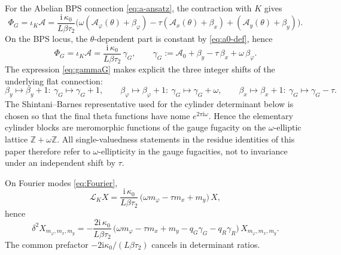 \documentclass[11pt,a4paper]{article}
\numberwithin{equation}{section}
\theoremstyle{plain}
\theoremstyle{definition}
\theoremstyle{remark}
\newcommand{\ii}{\mathrm{i}}
\begin{document}
For the Abelian BPS connection \eqref{eq:a-ansatz}, the contraction with $K$ gives
\[
\Phi_G=\iota_K\mathcal A=\frac{\ii\,\kappa_0}{L\beta\tau_2}\Big(\omega(\mathcal A_\varphi(\theta)+\beta_\varphi)-\tau(\mathcal A_x(\theta)+\beta_x)+(\mathcal A_y(\theta)+\beta_y)\Big).
\]
On the BPS locus, the $\theta$-dependent part is constant by \eqref{eq:a0-def}, hence
\begin{equation}
\Phi_G
=
\iota_K\mathcal A
=
\frac{\ii\,\kappa_0}{L\beta\tau_2}\,\gamma_G,
\qquad
\gamma_G:=\mathcal A_0+\beta_y-\tau\,\beta_x+\omega\,\beta_\varphi .
\label{eq:gammaG}
\end{equation}
The expression \eqref{eq:gammaG} makes explicit the three integer shifts of the underlying flat connection:
\begin{equation}
\beta_y\mapsto\beta_y+1:\ \gamma_G\mapsto\gamma_G+1,
\qquad
\beta_\varphi\mapsto\beta_\varphi+1:\ \gamma_G\mapsto\gamma_G+\omega,
\qquad
\beta_x\mapsto\beta_x+1:\ \gamma_G\mapsto\gamma_G-\tau .
\label{eq:gammaG-shifts}
\end{equation}
The Shintani--Barnes representative used for the cylinder determinant below is chosen so that the final theta functions have nome \(e^{2\pi\ii\omega}\).  Hence the elementary cylinder blocks are meromorphic functions of the gauge fugacity on the \(\omega\)-elliptic lattice \(\mathbb Z+\omega\mathbb Z\).  All single-valuedness statements in the residue identities of this paper therefore refer to \(\omega\)-ellipticity in the gauge fugacities, not to invariance under an independent shift by \(\tau\).

On Fourier modes \eqref{eq:Fourier},
\[
\mathcal{L}_K X = \frac{\ii\,\kappa_0}{L\beta\tau_2}\,\big(\omega m_\varphi-\tau m_x+m_y\big)\,X,
\]
hence
\begin{equation}
\delta^2 X_{m_\varphi,m_x,m_y}
=
-\frac{2\ii\,\kappa_0}{L\beta\tau_2}\,
\Big(\omega m_\varphi-\tau m_x+m_y-q_G\gamma_G-q_R\gamma_R\Big)\,
X_{m_\varphi,m_x,m_y}.
\label{eq:delta2eigs}
\end{equation}
The common prefactor $-2\ii\kappa_0/(L\beta\tau_2)$ cancels in determinant ratios.
\end{document}
